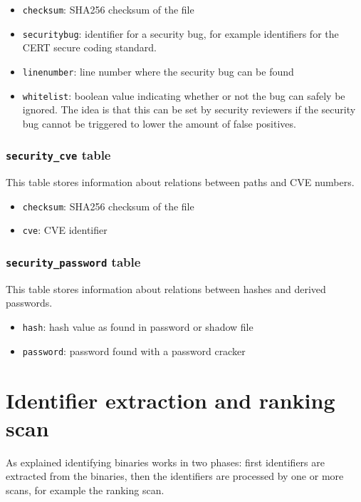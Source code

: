 \documentclass[10pt,a4paper]{article}
\begin{document}
\begin{itemize}
\item \texttt{checksum}: SHA256 checksum of the file
\item \texttt{securitybug}: identifier for a security bug, for example
identifiers for the CERT secure coding standard.
\item \texttt{linenumber}: line number where the security bug can be found
\item \texttt{whitelist}: boolean value indicating whether or not the bug can
safely be ignored. The idea is that this can be set by security reviewers if
the security bug cannot be triggered to lower the amount of false positives.
\end{itemize}

\subsubsection{\texttt{security\_cve} table}

This table stores information about relations between paths and CVE numbers.

\begin{itemize}
\item \texttt{checksum}: SHA256 checksum of the file
\item \texttt{cve}: CVE identifier
\end{itemize}

\subsubsection{\texttt{security\_password} table}

This table stores information about relations between hashes and derived passwords.

\begin{itemize}
\item \texttt{hash}: hash value as found in password or shadow file
\item \texttt{password}: password found with a password cracker
\end{itemize}

\section{Identifier extraction and ranking scan}

As explained identifying binaries works in two phases: first identifiers are
extracted from the binaries, then the identifiers are processed by one or more
scans, for example the ranking scan.
\end{document}
